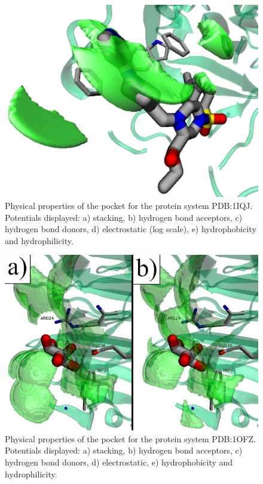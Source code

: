     \begin{figure}[H]
      \centering
      \includegraphics[width=1\textwidth]{figures/results/benchmark_prot/1iqj.png}
      \caption{\label{fig:benchmark/1iqj} Physical properties of the pocket for the protein system PDB:1IQJ. Potentials displayed: a) stacking, b) hydrogen bond acceptors, c) hydrogen bond donors, d) electrostatic (log scale), e) hydrophobicity and hydrophilicity.}
    \end{figure}

    \begin{figure}[H]
      \centering
      \includegraphics[width=1\textwidth]{figures/results/benchmark_prot/1ofz.png}
      \caption{\label{fig:benchmark/1ofz} Physical properties of the pocket for the protein system PDB:1OFZ. Potentials displayed: a) stacking, b) hydrogen bond acceptors, c) hydrogen bond donors, d) electrostatic, e) hydrophobicity and hydrophilicity.}
    \end{figure}

